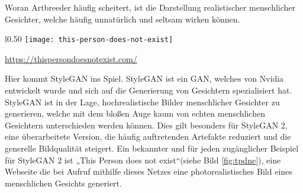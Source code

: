     
\noindent  Woran Artbreeder häufig scheitert, ist die Darstellung realistischer menschlicher Gesichter, welche häufig unnatürlich und seltsam wirken können.

\begin{wrapfigure}[18]{l}{0.50\textwidth}
    \centering
    \texttt{[image: this-person-does-not-exist]}
    \caption{KI-genertiertes Gesicht} \quelle\url{https://thispersondoesnotexist.com/}
    \label{fig:tpdne}
    \end{wrapfigure}

\hfill
\break
Hier kommt StyleGAN ins Spiel. StyleGAN ist ein GAN, welches von Nvidia entwickelt wurde und sich auf die Generierung von Gesichtern spezialisiert hat. StyleGAN ist in der Lage, hochrealistische Bilder menschlicher Gesichter zu generieren, welche mit dem bloßen Auge kaum von echten menschlichen Gesichtern unterschieden werden können. Dies gilt besonders für StyleGAN 2, eine überarbeitete Version, die häufig auftretenden Artefakte reduziert und die generelle Bildqualität steigert. Ein bekannter und für jeden zugänglicher Beispiel für StyleGAN 2 ist „This Person does not exist“(siehe Bild \ref{fig:tpdne}), eine Webseite die bei Aufruf mithilfe dieses Netzes eine photorealistisches Bild eines menschlichen Gesichts generiert.

\newpage
